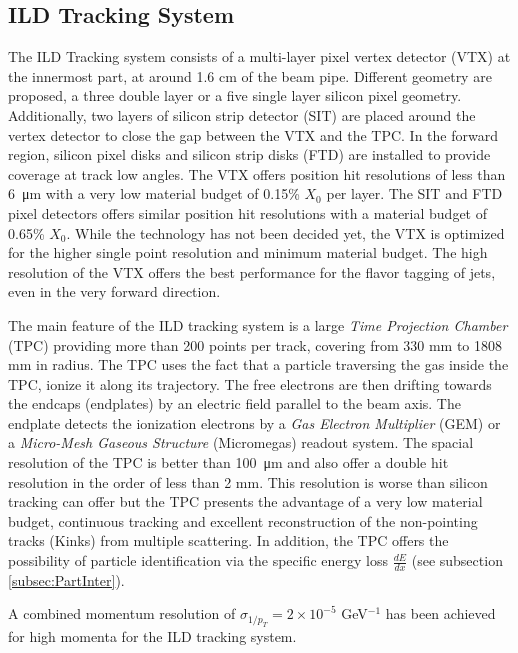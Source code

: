 \subsection{ILD Tracking System}

The ILD Tracking system consists of a multi-layer pixel vertex detector (VTX) at the innermost part, at around 1.6 cm of the beam pipe. Different geometry are proposed, a three double layer or a five single layer silicon pixel geometry. Additionally, two layers of silicon strip detector (SIT) are placed around the vertex detector to close the gap between the VTX and the TPC. In the forward region, silicon pixel disks and silicon strip disks (FTD) are installed to provide coverage at track low angles. The VTX offers position hit resolutions of less than \SI{6}{\micro\meter} with a very low material budget of 0.15\% $X_0$ per layer. The SIT and FTD pixel detectors offers similar position hit resolutions with a material budget of 0.65\% $X_0$. While the technology has not been decided yet, the VTX is optimized for the higher single point resolution and minimum material budget. The high resolution of the VTX offers the best performance for the flavor tagging of jets, even in the very forward direction.

The main feature of the ILD tracking system is a large \textit{Time Projection Chamber} (TPC) providing more than 200 points per track, covering from 330 mm to 1808 mm in radius. The TPC uses the fact that a particle traversing the gas inside the TPC, ionize it along its trajectory. The free electrons are then drifting towards the endcaps (endplates) by an electric field parallel to the beam axis. The endplate detects the ionization electrons by a \textit{Gas Electron Multiplier} (GEM) or a \textit{Micro-Mesh Gaseous Structure} (Micromegas) readout system. The spacial resolution of the TPC is better than \SI{100}{\micro\meter} and also offer a double hit resolution in the order of less than 2 mm. This resolution is worse than silicon tracking can offer but the TPC presents the advantage of a very low material budget, continuous tracking and excellent reconstruction of the non-pointing tracks (Kinks) from multiple scattering. In addition, the TPC offers the possibility of particle identification via the specific energy loss $\frac{dE}{dx}$ (see subsection \ref{subsec:PartInter}).

A combined momentum resolution of $\sigma_{1/p_T} = 2 \times 10^{-5}$ GeV$^{-1}$ has been achieved for high momenta for the ILD tracking system.

